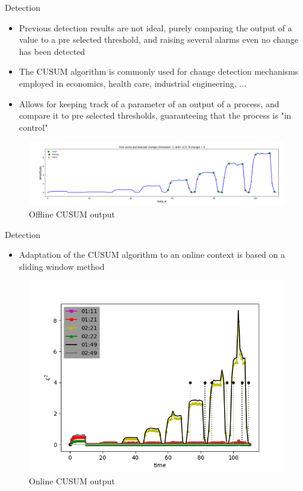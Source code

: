 \documentclass{beamer}
\begin{document}
\begin{frame}{Detection}
    \begin{itemize}

        \item Previous detection results are not ideal, purely comparing the output
            of a value to a pre selected threshold, and raising several alarms
            even no change has been detected
            \pause

        \item The CUSUM algorithm is commonly used for change detection mechanisms employed
            in economics, health care, industrial engineering, ...
        \item Allows for keeping track of a parameter of an output of a process, and 
            compare it to pre selected thresholds, guaranteeing that the process is "in control"
    \end{itemize}
    \pause
    \begin{figure}
        \includegraphics[width=1\textwidth]{meter_eleph/offline_cusum_output}
        \caption{Offline CUSUM output}
    \end{figure}
\end{frame}

\begin{frame}{Detection}
    \begin{itemize}
        \item Adaptation of the CUSUM algorithm to an online context is based on a sliding window
            method 
    \end{itemize}
    \pause
    \begin{figure}
        \includegraphics[width=.6\textwidth]{meter_eleph/detection_results_plotted}
        \caption{Online CUSUM output}
    \end{figure}
\end{frame}
\end{document}
